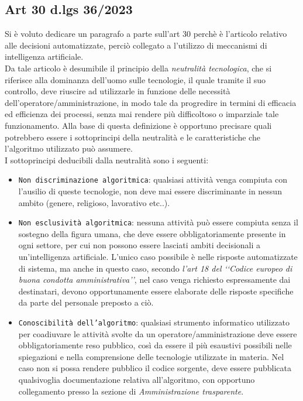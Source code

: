 \documentclass{article}
\begin{document}
\subsection{Art 30 d.lgs 36/2023}
\begin{justify}
    Si è voluto dedicare un paragrafo a parte sull'art 30 perchè è l'articolo relativo alle decisioni automatizzate, perciò collegato a l'utilizzo di meccanismi di intelligenza artificiale.\\
    Da tale articolo è desumibile il principio della \textit{neutralità tecnologica}, che si riferisce alla dominanza dell'uomo sulle tecnologie, il quale tramite il suo controllo, deve riuscire ad utilizzarle in funzione delle necessità dell'operatore/amministrazione, in modo tale da progredire in termini di efficacia ed efficienza dei processi, senza mai rendere più difficoltoso o imparziale tale funzionamento.
    Alla base di questa definizione è opportuno precisare quali potrebbero essere i sottoprincipi della neutralità e le caratteristiche che l'algoritmo utilizzato può assumere.\\
    I sottoprincipi deducibili dalla neutralità sono i seguenti:
    \begin{itemize}
        \item \texttt{Non discriminazione algoritmica}: qualsiasi attività venga compiuta con l'ausilio di queste tecnologie, non deve mai essere discriminante in nessun ambito (genere, religioso, lavorativo etc..).
        \item \texttt{Non esclusività algoritmica}: nessuna attività può essere compiuta senza il sostegno della figura umana, che deve essere obbligatoriamente presente in ogni settore, per cui non possono essere lasciati ambiti decisionali a un'intelligenza artificiale. L'unico caso possibile è nelle risposte automatizzate di sistema, ma anche in questo caso, secondo \textit{l'art 18 del ‘‘Codice europeo di buona condotta amministrativa’’}, nel caso venga richiesto espressamente dai destinatari, devono opportunamente essere elaborate delle risposte specifiche da parte del personale preposto a ciò.
        \item \texttt{Conoscibilità dell'algoritmo}: qualsiasi strumento informatico utilizzato per coadiuvare le attività svolte da un operatore/amministrazione deve essere obbligatoriamente reso pubblico, così da essere il più esaustivi possibili nelle spiegazioni e nella comprensione delle tecnologie utilizzate in materia. Nel caso non si possa rendere pubblico il codice sorgente, deve essere pubblicata qualsivoglia documentazione relativa all'algoritmo, con opportuno collegamento presso la sezione di \textit{Amministrazione trasparente}.

\end{itemize}
\end{justify}
\end{document}
